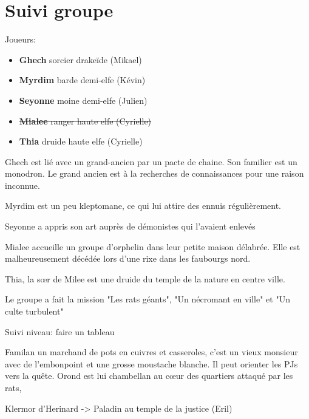 \section{Suivi groupe}

Joueurs:
\begin{itemize}
  \item {\bf Ghech} sorcier drakeïde (Mikael)
  \item {\bf Myrdim} barde demi-elfe (Kévin)
  \item {\bf Seyonne} moine demi-elfe (Julien)
  \item \sout{{\bf Mialee} ranger haute elfe (Cyrielle)}
  \item {\bf Thia} druide haute elfe (Cyrielle)
\end{itemize}

Ghech est lié avec un grand-ancien par un pacte de chaine. Son familier est un 
monodron. Le grand ancien est à la recherches de connaissances pour une raison
inconnue.

Myrdim est un peu kleptomane, ce qui lui attire des ennuis régulièrement.

Seyonne a appris son art auprès de démonistes qui l'avaient enlevés

Mialee accueille un groupe d'orphelin dans leur petite maison délabrée. Elle
est malheureusement décédée lors d'une rixe dans les faubourgs nord.

Thia, la s\oe{}r de Milee est une druide du temple de la nature en centre ville.

Le groupe a fait la mission "Les rats géants", "Un nécromant en ville" et "Un culte turbulent"

Suivi niveau: faire un tableau

Familan un marchand de pots en cuivres et 
casseroles, c'est un vieux monsieur avec de l'embonpoint et une grosse 
moustache blanche. Il peut orienter les PJs vers la quête.
Orond est lui chambellan au c\oe{}ur des quartiers attaqué par les rats,

Klermor d'Herinard -> Paladin au temple de la justice (Eril)


